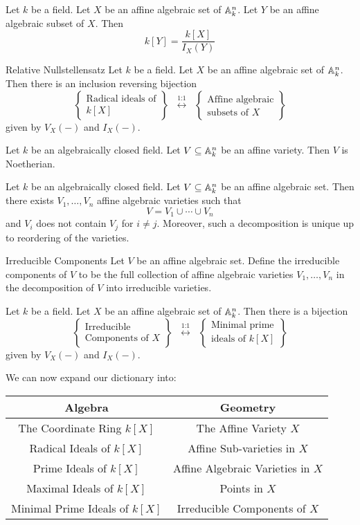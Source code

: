 \documentclass[a4paper]{article}
\begin{document}
\begin{lmm}{}{} Let $k$ be a field. Let $X$ be an affine algebraic set of $\mathbb{A}_k^n$. Let $Y$ be an affine algebraic subset of $X$. Then $$k[Y]=\frac{k[X]}{I_X(Y)}$$
\end{lmm}

\begin{thm}{Relative Nullstellensatz}{} Let $k$ be a field. Let $X$ be an affine algebraic set of $\mathbb{A}_k^n$. Then there is an inclusion reversing bijection $$\left\{\substack{\text{Radical ideals of}\\ k[X]}\right\}\;\;\overset{\text{1:1}}{\longleftrightarrow}\;\;\left\{\substack{\text{Affine algebraic}\\\text{subsets of }X}\right\}$$ given by $V_X(-)$ and $I_X(-)$. 
\end{thm}

\begin{prp}{}{} Let $k$ be an algebraically closed field. Let $V\subseteq\mathbb{A}_k^n$ be an affine variety. Then $V$ is Noetherian. 
\end{prp}

\begin{thm}{}{} Let $k$ be an algebraically closed field. Let $V\subseteq\mathbb{A}_k^n$ be an affine algebraic set. Then there exists $V_1,\dots,V_n$ affine algebraic varieties such that $$V=V_1\cup\cdots\cup V_n$$ and $V_i$ does not contain $V_j$ for $i\neq j$. Moreover, such a decomposition is unique up to reordering of the varieties. 
\end{thm}

\begin{defn}{Irreducible Components}{} Let $V$ be an affine algebraic set. Define the irreducible components of $V$ to be the full collection of affine algebraic varieties $V_1,\dots,V_n$ in the decomposition of $V$ into irreducible varieties. 
\end{defn}

\begin{lmm}{}{} Let $k$ be a field. Let $X$ be an affine algebraic set of $\mathbb{A}_k^n$. Then there is a bijection $$\left\{\substack{\text{Irreducible}\\\text{Components of } X}\right\}\;\;\overset{\text{1:1}}{\longleftrightarrow}\;\;\left\{\substack{\text{Minimal prime}\\\text{ideals of }k[X]}\right\}$$ given by $V_X(-)$ and $I_X(-)$. 
\end{lmm}

We can now expand our dictionary into: \\
\begin{center}\begin{tabular}{c|c}
Algebra & Geometry\\
\hline
The Coordinate Ring $k[X]$ & The Affine Variety $X$\\
Radical Ideals of $k[X]$ & Affine Sub-varieties in $X$\\
Prime Ideals of $k[X]$ & Affine Algebraic Varieties in $X$\\
Maximal Ideals of $k[X]$ & Points in $X$\\
Minimal Prime Ideals of $k[X]$ & Irreducible Components of $X$
\end{tabular}\end{center}
\end{document}
